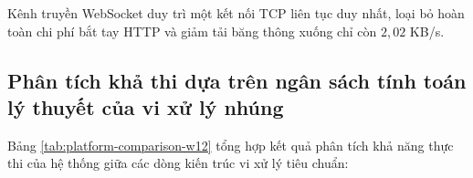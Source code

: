 \begin{table}[H]
\centering
\caption{So sánh chi phí tiêu tốn băng thông và độ trễ giữa REST Polling và WebSocket ở tần số 10 Hz}
\label{tab:network-protocol-overhead-w12}
\end{table}

Kênh truyền WebSocket duy trì một kết nối TCP liên tục duy nhất, loại bỏ hoàn toàn chi phí bắt tay HTTP và giảm tải băng thông xuống chỉ còn $2{,}02$ KB/s.

\subsection{Phân tích khả thi dựa trên ngân sách tính toán lý thuyết của vi xử lý nhúng}

\hspace{0.5cm} Bảng \ref{tab:platform-comparison-w12} tổng hợp kết quả phân tích khả năng thực thi của hệ thống giữa các dòng kiến trúc vi xử lý tiêu chuẩn:

